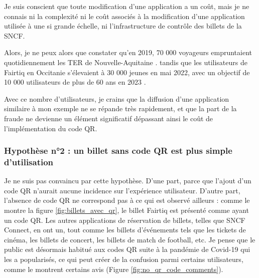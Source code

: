 \documentclass[a4paper]{article}
\begin{document}
Je suis conscient que toute modification d'une application a un coût, mais je ne connais
ni la complexité ni le coût associés à la modification d'une application utilisée à une
si grande échelle, ni l'infrastructure de contrôle des billets de la SNCF.


Alors, je ne peux alors que constater qu'en 2019, 70 000 voyageurs empruntaient quotidiennement
les TER de Nouvelle-Aquitaine \cite{RSE}.
tandis que les utilisateurs de Fairtiq en Occitanie s'élevaient à 30 000 jeunes en mai 2022, avec un objectif de 10 000 utilisateurs
de plus de 60 ans en 2023 \cite{plus_eq_moins_laregion}.

Avec ce nombre d'utilisateurs, je crains que la diffusion d'une application similaire à mon exemple
ne se répande très rapidement, et que la part de la fraude ne devienne un élément significatif dépassant ainsi
le coût de l'implémentation du code QR.



\subsubsection*{Hypothèse n°2 : un billet sans code QR est plus simple d'utilisation}
Je ne suis pas convaincu par cette hypothèse. D'une part, parce que l'ajout d'un code QR
n'aurait aucune incidence sur l'expérience utilisateur. D'autre part, l'absence de code QR
ne correspond pas à ce qui est observé ailleurs : comme le montre la figure \ref*{fig:billets_avec_qr},
le billet Fairtiq est présenté comme ayant un code QR. Les autres applications de réservation de
billets, telles que SNCF Connect, en ont un, tout comme les billets d'événements tels que les
tickets de cinéma, les billets de concert, les billets de match de football, etc. Je pense que
le public est désormais habitué aux codes QR suite à la pandémie de Covid-19 qui les a popularisés,
ce qui peut créer de la confusion parmi certains utilisateurs, comme le montrent certains avis (Figure \ref*{fig:no_qr_code_comments}).
\end{document}
